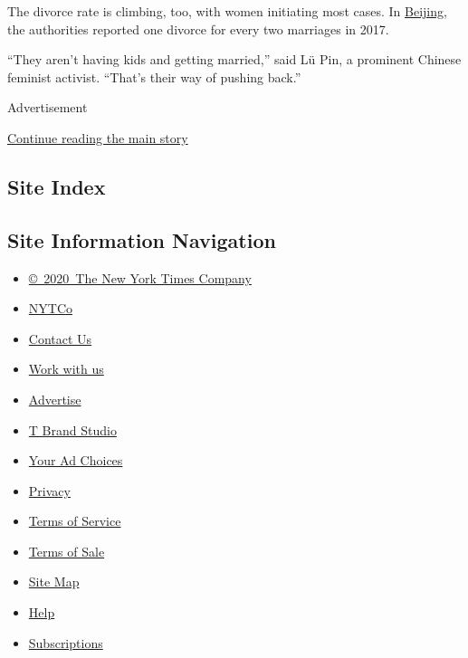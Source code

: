 The divorce rate is climbing, too, with women initiating most cases. In
\href{http://mzj.beijing.gov.cn/news/root/tjnb/2019-04/129817.shtml}{Beijing},
the authorities reported one divorce for every two marriages in 2017.

``They aren't having kids and getting married,'' said Lü Pin, a
prominent Chinese feminist activist. ``That's their way of pushing
back.''

Advertisement

\protect\hyperlink{after-bottom}{Continue reading the main story}

\hypertarget{site-index}{%
\subsection{Site Index}\label{site-index}}

\hypertarget{site-information-navigation}{%
\subsection{Site Information
Navigation}\label{site-information-navigation}}

\begin{itemize}
\tightlist
\item
  \href{https://help.nytimes.com/hc/en-us/articles/115014792127-Copyright-notice}{©~2020~The
  New York Times Company}
\end{itemize}

\begin{itemize}
\tightlist
\item
  \href{https://www.nytco.com/}{NYTCo}
\item
  \href{https://help.nytimes.com/hc/en-us/articles/115015385887-Contact-Us}{Contact
  Us}
\item
  \href{https://www.nytco.com/careers/}{Work with us}
\item
  \href{https://nytmediakit.com/}{Advertise}
\item
  \href{http://www.tbrandstudio.com/}{T Brand Studio}
\item
  \href{https://www.nytimes.com/privacy/cookie-policy\#how-do-i-manage-trackers}{Your
  Ad Choices}
\item
  \href{https://www.nytimes.com/privacy}{Privacy}
\item
  \href{https://help.nytimes.com/hc/en-us/articles/115014893428-Terms-of-service}{Terms
  of Service}
\item
  \href{https://help.nytimes.com/hc/en-us/articles/115014893968-Terms-of-sale}{Terms
  of Sale}
\item
  \href{https://spiderbites.nytimes.com}{Site Map}
\item
  \href{https://help.nytimes.com/hc/en-us}{Help}
\item
  \href{https://www.nytimes.com/subscription?campaignId=37WXW}{Subscriptions}
\end{itemize}
